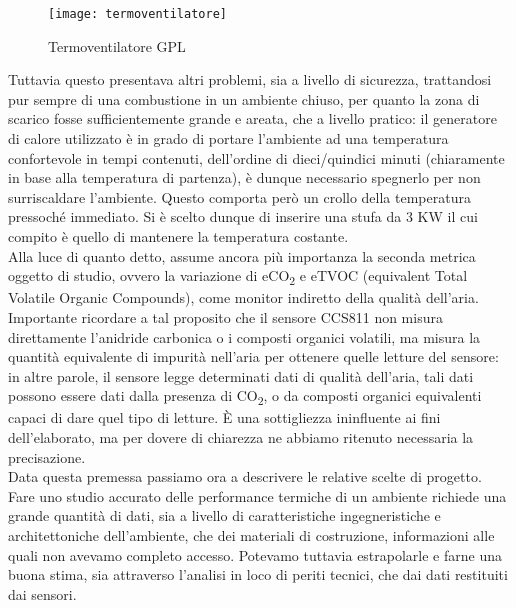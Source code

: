 \documentclass[fleqn,10pt]{SelfArx} %
\begin{document}
\begin{figure}[htb!]\centering
	\texttt{[image: termoventilatore]}
	\caption{Termoventilatore GPL}
	\label{fig:termoventilatore}
\end{figure}

Tuttavia questo presentava altri problemi, sia a livello di sicurezza, trattandosi pur sempre di una combustione 
in un ambiente chiuso, per quanto la zona di scarico fosse sufficientemente grande e areata, che a livello pratico:
il generatore di calore utilizzato è in grado di portare l'ambiente ad una temperatura confortevole in tempi 
contenuti, dell'ordine di dieci/quindici minuti (chiaramente in base alla temperatura di partenza), è dunque 
necessario spegnerlo per non surriscaldare l'ambiente. Questo comporta però un crollo della temperatura pressoché 
immediato. Si è scelto dunque di inserire una stufa da 3 KW il cui compito è quello di mantenere la temperatura costante.\\
Alla luce di quanto detto, assume ancora più importanza la seconda metrica oggetto di studio, ovvero la 
variazione di eCO\textsubscript{2} e eTVOC (equivalent Total Volatile Organic Compounds), come monitor indiretto della 
qualità dell'aria.\\
Importante ricordare a tal proposito che il sensore CCS811 non misura direttamente l'anidride carbonica o i composti organici 
volatili, ma misura la quantità equivalente di impurità nell'aria per ottenere quelle letture del sensore: in altre parole, 
il sensore legge determinati dati di qualità dell'aria, tali dati possono essere dati dalla presenza di CO\textsubscript{2}, 
o da composti organici equivalenti capaci di dare quel tipo di letture. È una sottigliezza ininfluente ai fini dell'elaborato, 
ma per dovere di chiarezza ne abbiamo ritenuto necessaria la precisazione.\\

Data questa premessa passiamo ora a descrivere le relative scelte di progetto.\\
Fare uno studio accurato delle performance termiche di un ambiente richiede una grande quantità di dati, sia a livello 
di caratteristiche ingegneristiche e architettoniche dell'ambiente, che dei materiali di costruzione, informazioni 
alle quali non avevamo completo accesso. Potevamo tuttavia estrapolarle e farne una buona stima, sia attraverso 
l'analisi in loco di periti tecnici, che dai dati restituiti dai sensori.\\
\end{document}
